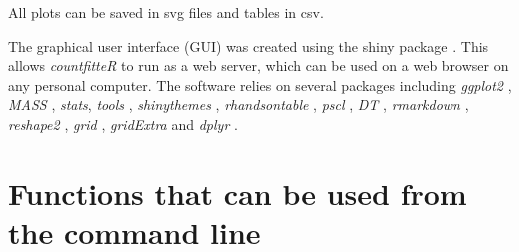 All plots can be saved in svg files and tables in csv.

The graphical user interface  (GUI) was created using  the shiny package \citep{shiny}. This allows \emph{countfitteR} to run as a web server, which can be used on a web browser on any personal computer. The software relies on several packages including \emph{ggplot2} \citep{ggplot2}, \emph{MASS} \citep{MASS}, \emph{stats}, \emph{tools} \citep{Rrr}, \emph{shinythemes} \citep{shinythemes}, \emph{rhandsontable} \citep{rhandsontable}, \emph{pscl} \citep{pscl}, \emph{DT} \citep{DT}, \emph{rmarkdown} \citep{rmarkdown}, \emph{reshape2} \citep{reshape2}, \emph{grid} \citep{Rrr}, \emph{gridExtra} \citep{gridextra} and \emph{dplyr}  \citep{dplyr}.


% 

\section{Functions that can be used from the command line}

